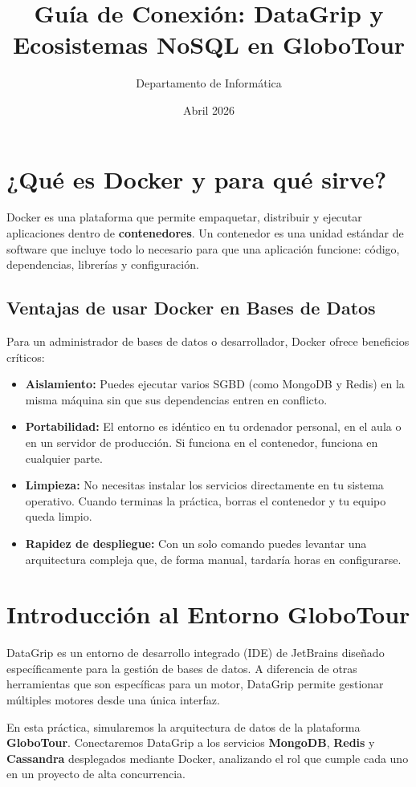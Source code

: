 \documentclass[12pt,a4paper]{article}
\title{\textbf{Guía de Conexión: DataGrip y Ecosistemas NoSQL en GloboTour}}
\author{Departamento de Informática}
\date{Abril 2026}
\begin{document}
\maketitle

\section{¿Qué es Docker y para qué sirve?}
Docker es una plataforma que permite empaquetar, distribuir y ejecutar aplicaciones dentro de \textbf{contenedores}. Un contenedor es una unidad estándar de software que incluye todo lo necesario para que una aplicación funcione: código, dependencias, librerías y configuración.

\subsection{Ventajas de usar Docker en Bases de Datos}
Para un administrador de bases de datos o desarrollador, Docker ofrece beneficios críticos:
\begin{itemize}
    \item \textbf{Aislamiento:} Puedes ejecutar varios SGBD (como MongoDB y Redis) en la misma máquina sin que sus dependencias entren en conflicto.
    \item \textbf{Portabilidad:} El entorno es idéntico en tu ordenador personal, en el aula o en un servidor de producción. Si funciona en el contenedor, funciona en cualquier parte.
    \item \textbf{Limpieza:} No necesitas instalar los servicios directamente en tu sistema operativo. Cuando terminas la práctica, borras el contenedor y tu equipo queda limpio.
    \item \textbf{Rapidez de despliegue:} Con un solo comando puedes levantar una arquitectura compleja que, de forma manual, tardaría horas en configurarse.
\end{itemize}

\section*{Introducción al Entorno GloboTour}
DataGrip es un entorno de desarrollo integrado (IDE) de JetBrains diseñado específicamente para la gestión de bases de datos. A diferencia de otras herramientas que son específicas para un motor, DataGrip permite gestionar múltiples motores desde una única interfaz.

En esta práctica, simularemos la arquitectura de datos de la plataforma \textbf{GloboTour}. Conectaremos DataGrip a los servicios \textbf{MongoDB}, \textbf{Redis} y \textbf{Cassandra} desplegados mediante Docker, analizando el rol que cumple cada uno en un proyecto de alta concurrencia.
\end{document}
